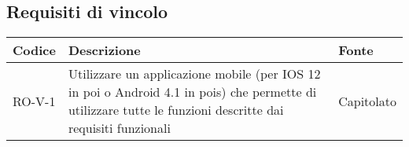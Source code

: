 \subsection{Requisiti di vincolo}
\begin{center}
\renewcommand{\arraystretch}{1.8} %
\begin{tabular}{ | m{8em} | m{18em} | m{12em} | }
\hline
Codice&Descrizione&Fonte\\
\hline
RO-V-1&Utilizzare un applicazione mobile (per IOS 12 in poi o Android 4.1 in pois) che permette di utilizzare tutte le funzioni descritte dai requisiti funzionali&Capitolato\\
\hline
\end{tabular}
\end{center}
